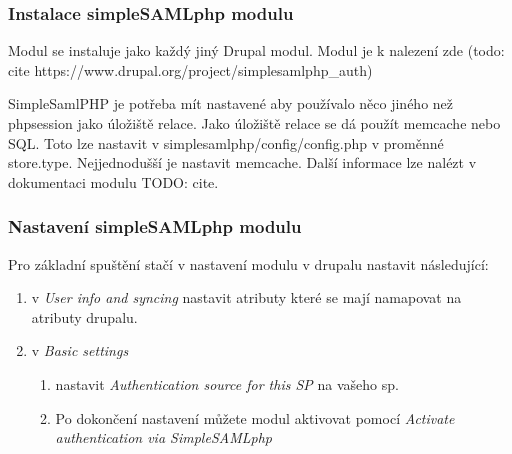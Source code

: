 \subsubsection{Instalace simpleSAMLphp modulu} %

Modul se instaluje jako každý jiný Drupal modul. Modul je k nalezení zde (todo: cite https://www.drupal.org/project/simplesamlphp_auth)

SimpleSamlPHP je potřeba mít nastavené aby používalo něco jiného než phpsession jako úložiště relace. Jako úložiště relace se dá použít memcache nebo SQL.
Toto lze nastavit v simplesamlphp/config/config.php v proměnné store.type.
Nejjednodušší je nastavit memcache. Další informace lze nalézt v dokumentaci modulu TODO: cite.

\subsubsection{Nastavení simpleSAMLphp modulu} %

Pro základní spuštění stačí v nastavení modulu v drupalu nastavit následující:

\begin{enumerate}
    \item v \emph{User info and syncing} nastavit atributy které se mají namapovat na atributy drupalu.
    \item v \emph{Basic settings}
    \begin{enumerate}
        \item nastavit \emph{Authentication source for this SP} na vašeho sp.
        \item Po dokončení nastavení můžete modul aktivovat pomocí \emph{Activate authentication via SimpleSAMLphp}
    \end{enumerate}

\end{enumerate}



    
    
